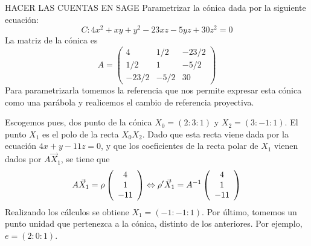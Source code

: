 \begin{exa}\label{C8_exa_parametrizacion_parabola}
	HACER LAS CUENTAS EN SAGE
	Parametrizar la cónica dada por la siguiente ecuación:
	\begin{equation}
		C:4x^2+xy+y^2-23xz-5yz+30z^2=0
	\end{equation}
	La matriz de la cónica es 
	\begin{equation*}
	A=\left( \begin{array}{rrr}
	4& 1/2 & -23/2\\
	 1/2 & 1 & -5/2\\
	-23/2 & -5/2 & 30
	\end{array}\right) 
	\end{equation*}
	Para parametrizarla tomemos la referencia que nos permite expresar esta cónica como una parábola y realicemos el cambio de referencia proyectiva.
	
	Escogemos pues, dos punto de la cónica $X_0=(2:3:1)$ y $X_2=(3:-1:1)$. El punto $X_1$ es el polo de la recta $X_0X_2$. Dado que esta recta viene dada por la ecuación $4x+y-11z=0$, y que los coeficientes de la recta polar de $X_1$ vienen dados por $A\vec{X}_1$, se tiene que
	\begin{equation*}
		A\vec{X}_1=\rho \left( \begin{array}{c}
		4\\1\\-11
		\end{array}\right)\Leftrightarrow \rho'\vec{X}_1=A^{-1}
		\left( \begin{array}{c}
			4\\1\\-11
		\end{array}\right)
	\end{equation*}
	Realizando los cálculos se obtiene $X_1=(-1:-1:1)$. Por último, tomemos un punto unidad que pertenezca a la cónica, distinto de los anteriores. Por ejemplo, $e=(2:0:1)$.
	

\end{exa}
